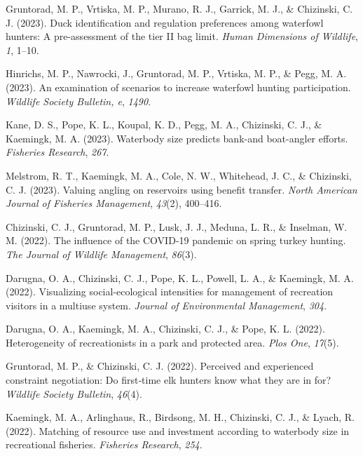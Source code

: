 \documentclass[
  12pt,
]
{article}
\newlength{\cslhangindent}
\newlength{\cslentryspacingunit} %
\newenvironment{CSLReferences}[2] %
 {%
  \setlength{\parindent}{0pt}
  \ifodd #1
  \let\oldpar\par
  \def\par{\hangindent=\cslhangindent\oldpar}
  \fi
  \setlength{\parskip}{#2\cslentryspacingunit}
 }%
 {}
\begin{document}
\hypertarget{refs-peer}{}
\begin{CSLReferences}{1}{0}
\leavevmode{}%
Gruntorad, M. P., Vrtiska, M. P., Murano, R. J., Garrick, M. J., \&
Chizinski, C. J. (2023). Duck identification and regulation preferences
among waterfowl hunters: A pre-assessment of the tier II bag limit.
\emph{Human Dimensions of Wildlife}, \emph{1}, 1--10.

\leavevmode{}%
Hinrichs, M. P., Nawrocki, J., Gruntorad, M. P., Vrtiska, M. P., \&
Pegg, M. A. (2023). An examination of scenarios to increase waterfowl
hunting participation. \emph{Wildlife Society Bulletin, e}, \emph{1490}.

\leavevmode{}%
Kane, D. S., Pope, K. L., Koupal, K. D., Pegg, M. A., Chizinski, C. J.,
\& Kaemingk, M. A. (2023). Waterbody size predicts bank-and boat-angler
efforts. \emph{Fisheries Research}, \emph{267}.

\leavevmode{}%
Melstrom, R. T., Kaemingk, M. A., Cole, N. W., Whitehead, J. C., \&
Chizinski, C. J. (2023). Valuing angling on reservoirs using benefit
transfer. \emph{North American Journal of Fisheries Management},
\emph{43}(2), 400--416.

\leavevmode{}%
Chizinski, C. J., Gruntorad, M. P., Lusk, J. J., Meduna, L. R., \&
Inselman, W. M. (2022). The influence of the COVID‐19 pandemic on spring
turkey hunting. \emph{The Journal of Wildlife Management}, \emph{86}(3).

\leavevmode{}%
Darugna, O. A., Chizinski, C. J., Pope, K. L., Powell, L. A., \&
Kaemingk, M. A. (2022). Visualizing social-ecological intensities for
management of recreation visitors in a multiuse system. \emph{Journal of
Environmental Management}, \emph{304}.

\leavevmode{}%
Darugna, O. A., Kaemingk, M. A., Chizinski, C. J., \& Pope, K. L.
(2022). Heterogeneity of recreationists in a park and protected area.
\emph{Plos One}, \emph{17}(5).

\leavevmode{}%
Gruntorad, M. P., \& Chizinski, C. J. (2022). Perceived and experienced
constraint negotiation: Do first‐time elk hunters know what they are in
for? \emph{Wildlife Society Bulletin}, \emph{46}(4).

\leavevmode{}%
Kaemingk, M. A., Arlinghaus, R., Birdsong, M. H., Chizinski, C. J., \&
Lyach, R. (2022). Matching of resource use and investment according to
waterbody size in recreational fisheries. \emph{Fisheries Research},
\emph{254}.


\end{CSLReferences}
\end{document}
